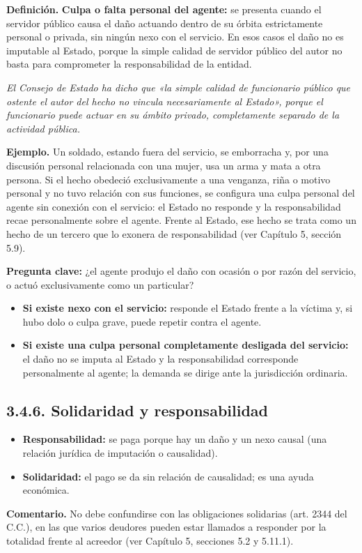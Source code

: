 \begin{definicion}
\textcolor[HTML]{1F3864}{\textbf{Definición. }}\textbf{Culpa o falta personal del agente: }se presenta cuando el servidor público causa el daño actuando dentro de su órbita estrictamente personal o privada, sin ningún nexo con el servicio. En esos casos el daño no es imputable al Estado, porque la simple calidad de servidor público del autor no basta para comprometer la responsabilidad de la entidad.
\end{definicion}
\begin{cita}
\textit{El Consejo de Estado ha dicho que «la simple calidad de funcionario público que ostente el autor del hecho no vincula necesariamente al Estado», porque el funcionario puede actuar en su ámbito privado, completamente separado de la actividad pública.}
\end{cita}
\begin{ejemplo}
\textcolor[HTML]{4F6228}{\textbf{Ejemplo. }}Un soldado, estando fuera del servicio, se emborracha y, por una discusión personal relacionada con una mujer, usa un arma y mata a otra persona. Si el hecho obedeció exclusivamente a una venganza, riña o motivo personal y no tuvo relación con sus funciones, se configura una culpa personal del agente sin conexión con el servicio: el Estado no responde y la responsabilidad recae personalmente sobre el agente. Frente al Estado, ese hecho se trata como un hecho de un tercero que lo exonera de responsabilidad (ver Capítulo 5, sección 5.9).
\end{ejemplo}
\textbf{Pregunta clave:} ¿el agente produjo el daño con ocasión o por razón del servicio, o actuó exclusivamente como un particular?

\begin{itemize}
\item \textbf{Si existe nexo con el servicio:} responde el Estado frente a la víctima y, si hubo dolo o culpa grave, puede repetir contra el agente.
\item \textbf{Si existe una culpa personal completamente desligada del servicio:} el daño no se imputa al Estado y la responsabilidad corresponde personalmente al agente; la demanda se dirige ante la jurisdicción ordinaria.
\end{itemize}
\subsection{3.4.6. Solidaridad y responsabilidad}
\begin{itemize}
\item \textbf{Responsabilidad:} se paga porque hay un daño y un nexo causal (una relación jurídica de imputación o causalidad).
\item \textbf{Solidaridad:} el pago se da sin relación de causalidad; es una ayuda económica.
\end{itemize}
\begin{comentario}
\textcolor[HTML]{8A6D3B}{\textbf{Comentario. }}No debe confundirse con las obligaciones solidarias (art. 2344 del C.C.), en las que varios deudores pueden estar llamados a responder por la totalidad frente al acreedor (ver Capítulo 5, secciones 5.2 y 5.11.1).
\end{comentario}
